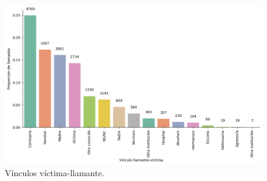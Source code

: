 \documentclass[10 pt]{article}
\begin{document}
        \begin{figure}[H]
            \begin{center}
            \includegraphics[scale=.5]{images/latex_vinculo_llamante.png}
            \caption{Vínculos víctima-llamante.}
            \label{vinculollamante}
            \end{center}
            \end{figure}



      
\end{document}
